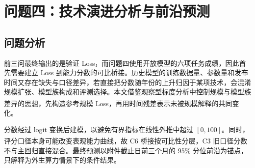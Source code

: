 \documentclass[bwprint]{gmcmthesis}
\numberwithin{equation}{section}
\numberwithin{figure}{section}
\numberwithin{table}{section}
\begin{document}
        
        


\section{问题四：技术演进分析与前沿预测}   %
    \subsection{问题分析}

    前三问最终输出的是验证 Loss，而问题四使用开放模型的六项任务成绩，因此首先需要建立 Loss 到能力分数的可比桥接。历史模型的训练数据量、参数量和发布时间又存在缺失与口径差异，若直接把分数随年份的上升归因于某项技术，会混淆规模扩张、模型族构成和评测选择。本文借鉴观察型标度分析中控制规模与模型族差异的思想\textsuperscript{\cite{ruan2024observational}}，先构造参考规模 Loss，再用时间残差表示未被规模解释的共同变化。

    分数经过 logit 变换后建模，以避免有界指标在线性外推中超过 $[0,100]$。同时，评分口径本身可能改变表观能力曲线\textsuperscript{\cite{schaeffer2023emergent}}，故 C6 桥接按可比性分层，C3 旧口径分数不与主回归直接混合。最终预测以附件截止日前三个月的 95\% 分位前沿为锚点，只解释为外生算力情景下的条件结果。
\end{document}

